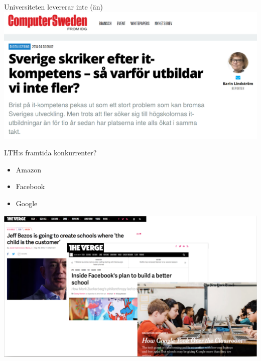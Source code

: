 \documentclass[aspectratio=169]{beamer}
\newenvironment{Slide}[1]%
  {\begin{frame}[environment=Slide]{#1}}
  {\end{frame}}%
\begin{document}
\begin{Slide}{Universiteten levererar inte (än)}
\includegraphics[height=0.75\textheight]{../img/utbilda-fler}
\end{Slide}


\begin{Slide}{LTH:s framtida konkurrenter?}
  \begin{minipage}{0.23\textwidth}
  \begin{itemize}
    \item Amazon
    \item Facebook
    \item Google
  \end{itemize}
  \end{minipage}
  \begin{minipage}{0.7\textwidth}
    \includegraphics[height=0.85\textheight]{../img/afg}
  \end{minipage}
\end{Slide}
\end{document}
